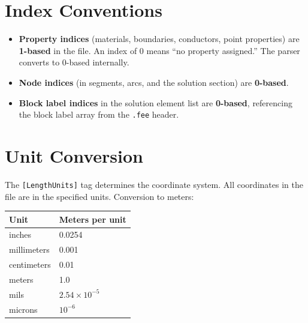 \documentclass[11pt]{article}
\begin{document}
\section{Index Conventions}

\begin{itemize}
  \item \textbf{Property indices} (materials, boundaries, conductors,
        point properties) are \textbf{1-based} in the file.  An index
        of 0 means ``no property assigned.''  The parser converts to
        0-based internally.

  \item \textbf{Node indices} (in segments, arcs, and the solution
        section) are \textbf{0-based}.

  \item \textbf{Block label indices} in the solution element list are
        \textbf{0-based}, referencing the block label array from the
        \texttt{.fee} header.
\end{itemize}

\section{Unit Conversion}

The \verb|[LengthUnits]| tag determines the coordinate system.  All
coordinates in the file are in the specified units.  Conversion to
meters:

\begin{center}
\begin{tabular}{ll}
\toprule
Unit & Meters per unit \\
\midrule
inches      & 0.0254 \\
millimeters & 0.001 \\
centimeters & 0.01 \\
meters      & 1.0 \\
mils        & $2.54 \times 10^{-5}$ \\
microns     & $10^{-6}$ \\
\bottomrule
\end{tabular}
\end{center}
\end{document}
